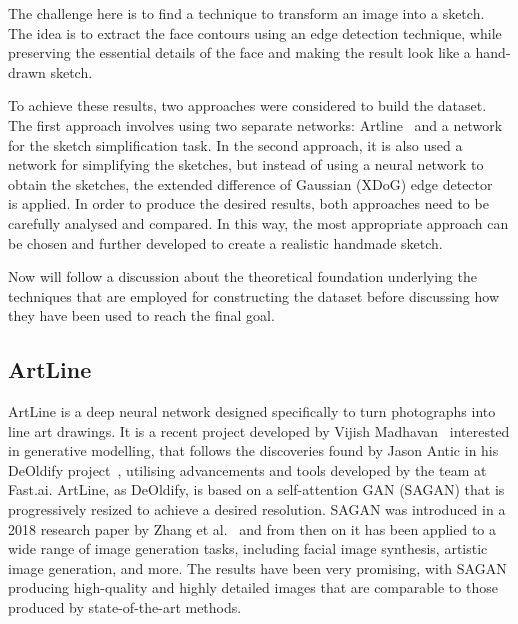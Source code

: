\noindent The challenge here is to find a technique to transform an image into a sketch. The idea is to extract the face contours using an edge detection technique, while preserving the essential details of the face and making the result look like a hand-drawn sketch.

\noindent To achieve these results, two approaches were considered to build the dataset. The first approach involves using two separate networks: Artline~\cite{artline} and a network for the sketch simplification task. In the second approach, it is also used a network for simplifying the sketches, but instead of using a neural network to obtain the sketches, the extended difference of Gaussian (XDoG) edge detector~\cite{xdog} is applied.
In order to produce the desired results, both approaches need to be carefully analysed and compared. In this way, the most appropriate approach can be chosen and further developed to create a realistic handmade sketch.

\noindent Now will follow a discussion about the theoretical foundation underlying the techniques that are employed for constructing the dataset before discussing how they have been used to reach the final goal.

\subsection{ArtLine}
ArtLine is a deep neural network designed specifically to turn photographs into line art drawings. It is a recent project developed by Vijish Madhavan~\cite{artline} interested in generative modelling, that follows the discoveries found by Jason Antic in his DeOldify project~\cite{deoldify}, utilising advancements and tools developed by the team at Fast.ai. ArtLine, as DeOldify, is based on a self-attention GAN (SAGAN) that is progressively resized to achieve a desired resolution. SAGAN was introduced in a 2018 research paper by Zhang et al.~\cite{SaGAN} and from then on it has been applied to a wide range of image generation tasks, including facial image synthesis, artistic image generation, and more. The results have been very promising, with SAGAN producing high-quality and highly detailed images that are comparable to those produced by state-of-the-art methods.

